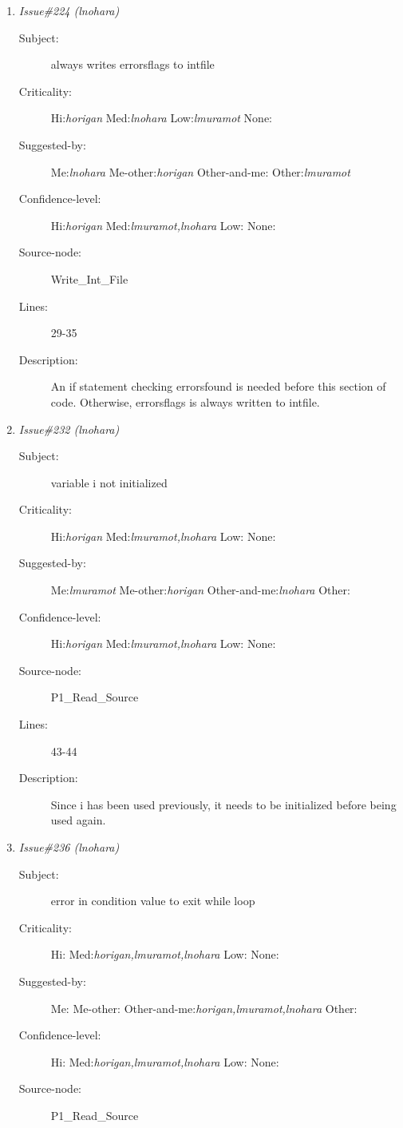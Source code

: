 \begin{enumerate}
\begin{description}
\item [Lines:] 56

\item [Description:] Need to set searching to false so that the while
loop will exit.
\end{description}
\item {\it Issue\#224 (lnohara)}
\begin{description}
\item [Subject:] always writes errorsflags to intfile
\item [Criticality:] Hi:{\it horigan} Med:{\it lnohara} Low:{\it lmuramot} None:{\it }
\item [Suggested-by:] Me:{\it lnohara} Me-other:{\it horigan} Other-and-me:{\it } Other:{\it lmuramot}
\item [Confidence-level:] Hi:{\it horigan} Med:{\it lmuramot,lnohara} Low:{\it } None:{\it }
\item [Source-node:] Write\_Int\_File

\item [Lines:] 29-35

\item [Description:] An if statement checking errorsfound is needed
before this section of code.  Otherwise, errorsflags is always written to
intfile.
\end{description}
\item {\it Issue\#232 (lnohara)}
\begin{description}
\item [Subject:] variable i not initialized
\item [Criticality:] Hi:{\it horigan} Med:{\it lmuramot,lnohara} Low:{\it } None:{\it }
\item [Suggested-by:] Me:{\it lmuramot} Me-other:{\it horigan} Other-and-me:{\it lnohara} Other:{\it }
\item [Confidence-level:] Hi:{\it horigan} Med:{\it lmuramot,lnohara} Low:{\it } None:{\it }
\item [Source-node:] P1\_Read\_Source

\item [Lines:] 43-44

\item [Description:] Since i has been used previously, it needs to
be initialized before being used again.
\end{description}
\item {\it Issue\#236 (lnohara)}
\begin{description}
\item [Subject:] error in condition value to exit while loop
\item [Criticality:] Hi:{\it } Med:{\it horigan,lmuramot,lnohara} Low:{\it } None:{\it }
\item [Suggested-by:] Me:{\it } Me-other:{\it } Other-and-me:{\it horigan,lmuramot,lnohara} Other:{\it }
\item [Confidence-level:] Hi:{\it } Med:{\it horigan,lmuramot,lnohara} Low:{\it } None:{\it }
\item [Source-node:] P1\_Read\_Source


\end{description}
\end{enumerate}
